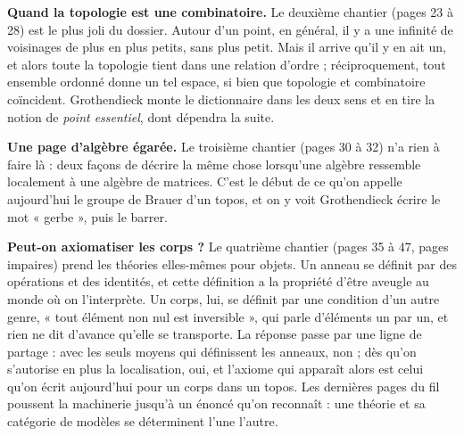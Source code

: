 \documentclass[11pt,a4paper]{article}
\begin{document}
\begin{resume}
\textbf{Quand la topologie est une combinatoire.} Le deuxième chantier
(pages 23 à 28) est le plus joli du dossier. Autour d'un point, en général, il
y a une infinité de voisinages de plus en plus petits, sans plus petit. Mais il
arrive qu'il y en ait un, et alors toute la topologie tient dans une relation
d'ordre ; réciproquement, tout ensemble ordonné donne un tel espace, si bien
que topologie et combinatoire coïncident. Grothendieck monte le dictionnaire dans
les deux sens et en tire la notion de \emph{point essentiel}, dont dépendra la
suite.

\textbf{Une page d'algèbre égarée.} Le troisième chantier (pages 30 à 32) n'a
rien à faire là : deux façons de décrire la même chose lorsqu'une algèbre
ressemble localement à une algèbre de matrices. C'est le début de ce qu'on
appelle aujourd'hui le groupe de Brauer d'un topos, et on y voit Grothendieck
écrire le mot « gerbe », puis le barrer.

\textbf{Peut-on axiomatiser les corps ?} Le quatrième chantier (pages 35 à 47,
pages impaires) prend les théories elles-mêmes pour objets. Un anneau se
définit par des opérations et des identités, et cette définition a la propriété
d'être aveugle au monde où on l'interprète. Un corps, lui, se définit par une
condition d'un autre genre, « tout élément non nul est inversible », qui parle
d'éléments un par un, et rien ne dit d'avance qu'elle se transporte. La réponse
passe par une ligne de partage : avec les seuls moyens qui
définissent les anneaux, non ; dès qu'on s'autorise en plus la localisation,
oui, et l'axiome qui apparaît alors est celui qu'on écrit
aujourd'hui pour un corps dans un topos. Les dernières pages du fil poussent la
machinerie jusqu'à un énoncé qu'on reconnaît : une théorie et sa catégorie de
modèles se déterminent l'une l'autre.


\end{resume}
\end{document}
